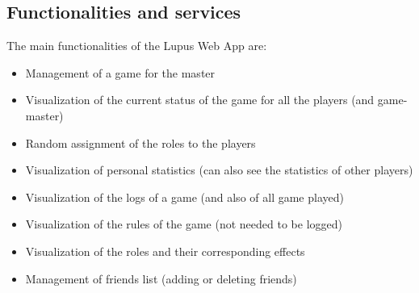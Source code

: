 \subsection{Functionalities and services}
The main functionalities of the Lupus Web App are:
\begin{itemize}
    \item Management of a game for the master
    \item Visualization of the current status of the game for all the players (and game-master)
    \item Random assignment of the roles to the players
    \item Visualization of personal statistics (can also see the statistics of other players)
    \item Visualization of the logs of a game (and also of all game played)
    \item Visualization of the rules of the game (not needed to be logged)
    \item Visualization of the roles and their corresponding effects
    \item Management of friends list (adding or deleting friends)

\end{itemize}



